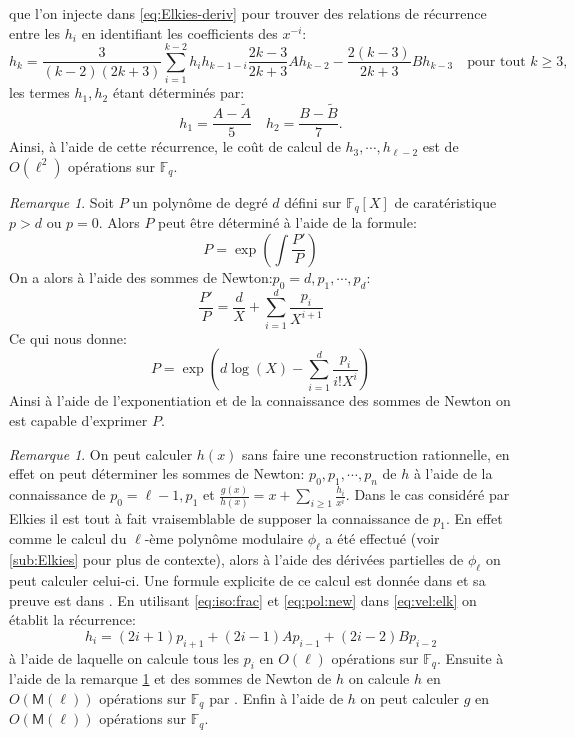 \documentclass[10pt,a4paper]{book}
\theoremstyle{plain}
\theoremstyle{definition}
\theoremstyle{definition}
\theoremstyle{definition}
\theoremstyle{definition}
\theoremstyle{remark}
\newtheorem{rem}[thm]{Remarque}
\theoremstyle{remark}
\begin{document}
que l'on injecte dans \eqref{eq:Elkies-deriv} pour trouver des relations de récurrence entre les $h_i$ en identifiant les coefficients des $x^{-i}$:
\begin{equation}
\label{eq:rec:h_k}
h_k=\frac{3}{(k-2)(2k+3)}\sum_{i=1}^{k-2}h_ih_{k-1-i}\frac{2k-3}{2k+3}Ah_{k-2}-\frac{2(k-3)}{2k+3}Bh_{k-3} \quad \text{pour tout } k \geqslant 3,
\end{equation}
les termes $h_1,h_2$ étant déterminés par:
\begin{equation}
h_1=\frac{A-\tilde{A}}{5} \quad h_2={\frac{B-\tilde{B}}{7}}.
\end{equation}
Ainsi, à l'aide de cette récurrence, le coût de calcul de $h_3, \cdots , h_{\ell-2}$ est de $O(\ell^2)$ opérations sur $\mathbb{F}_q$. 

\begin{rem}
\label{rem:pol:rec}
Soit $P$ un polynôme de degré $d$ défini sur $\mathbb{F}_q[X]$ de caratéristique $p>d$ ou $p=0$. Alors $P$ peut être déterminé à l'aide de la formule:
\begin{equation}
P=\exp\left(\int{\frac{P'}{P}}\right)
\end{equation} 
On a alors à l'aide des sommes de Newton:$p_0=d,p_1, \cdots, p_d$:
\begin{equation}
\label{eq:pol:new}
\frac{P'}{P}= \frac{d}{X} + \sum_{i = 1}^d \frac{p_i}{X^{i+1}}
\end{equation}
Ce qui nous donne:
\begin{equation}
P=\exp\left( d \log(X) - \sum_{i = 1}^{d} \frac{p_i}{i!X^i} \right)
\end{equation} 
Ainsi à l'aide de l'exponentiation et de la connaissance des sommes de Newton on est capable d'exprimer $P$.
\end{rem}

\begin{rem}
\label{rem:ELK:h-p}
On peut calculer $h(x)$ sans faire une reconstruction rationnelle, en effet on peut déterminer les sommes de Newton: $p_0,p_1,\cdots, p_n$ de $h$ à l'aide de la connaissance de $p_0=\ell-1, p_1$ et $\frac{g(x)}{h(x)}=x+\sum_{i \geqslant 1}\frac{h_i}{x^i}$. Dans le cas considéré par Elkies il est tout à fait vraisemblable de supposer la connaissance de $p_1$. En effet comme le calcul du $\ell$-ème polynôme modulaire $\phi_{\ell}$ a été effectué (voir \ref{sub:Elkies} pour plus de contexte), alors à l'aide des dérivées partielles de $\phi_{\ell}$ on peut calculer celui-ci. Une formule explicite de ce calcul est donnée dans \cite[Theorem 17.22]{ehcc05} et sa preuve est dans \cite[§7]{Schoof95}. En utilisant \eqref{eq:iso:frac} et \eqref{eq:pol:new} dans \eqref{eq:vel:elk} on établit la récurrence:
\begin{equation}
\label{eq:p:rec}
h_i=(2i+1)p_{i+1}+(2i-1)Ap_{i-1}+(2i-2)Bp_{i-2}
\end{equation}
à l'aide de laquelle on calcule tous les $p_i$ en $O(\ell)$ opérations sur $\mathbb{F}_q$. Ensuite à l'aide de la remarque \ref{rem:pol:rec} et des sommes de Newton de $h$ on calcule $h$ en $O(\mathsf{M}(\ell))$ opérations sur $\mathbb{F}_q$ par \cite[§2.2]{BMSS08}.
Enfin à l'aide de $h$ on peut calculer $g$ en $O(\mathsf{M}(\ell))$ opérations sur $\mathbb{F}_q$.
\end{rem}
\end{document}
